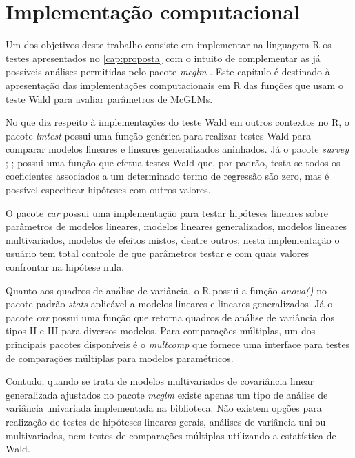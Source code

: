 
\chapter{Implementação computacional}\label{cap:implementacao}

Um dos objetivos deste trabalho consiste em implementar na linguagem R os testes apresentados no \autoref{cap:proposta} com o intuito de complementar as já possíveis análises permitidas pelo pacote \emph{mcglm} \citep{mcglm}. Este capítulo é destinado à apresentação das implementações computacionais em R das funções que usam o teste Wald para avaliar parâmetros de McGLMs.

No que diz respeito à implementações do teste Wald em outros contextos no R, o pacote \emph{lmtest} \citep{lmtest} possui uma função genérica para realizar testes Wald para comparar modelos lineares e lineares generalizados aninhados. Já o pacote \emph{survey} \citep{survey1}; \citep{survey2};\citep{survey3} possui uma função que efetua testes Wald que, por padrão, testa se todos os coeficientes associados a um determinado termo de regressão são zero, mas é possível especificar hipóteses com outros valores. 

O pacote \emph{car} \citep{car} possui uma implementação para testar hipóteses lineares sobre parâmetros de modelos lineares, modelos lineares generalizados, modelos lineares multivariados, modelos de efeitos mistos, dentre outros; nesta implementação o usuário tem total controle de que parâmetros testar e com quais valores confrontar na hipótese nula. 

Quanto aos quadros de análise de variância, o R possui a função \emph{anova()} no pacote padrão \emph{stats} \citep{softwareR} aplicável a modelos lineares e lineares generalizados. Já o pacote \emph{car} \citep{car} possui uma função que retorna quadros de análise de variância dos tipos II e III para diversos modelos. Para comparações múltiplas, um dos principais pacotes disponíveis é o \emph{multcomp} \citep{multcomp} que fornece uma interface para testes de comparações múltiplas para modelos paramétricos.

Contudo, quando se trata de modelos multivariados de covariância linear generalizada ajustados no pacote \emph{mcglm} existe apenas um tipo de análise de variância univariada implementada na biblioteca. Não existem opções para realização de testes de hipóteses lineares gerais, análises de variância uni ou multivariadas, nem testes de comparações múltiplas utilizando a estatística de Wald. 

